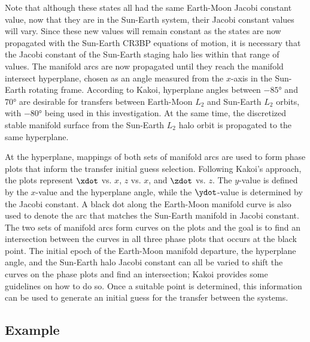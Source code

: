 Note that although these states all had the same Earth-Moon Jacobi constant
value, now that they are in the Sun-Earth system, their Jacobi constant values will vary. Since
these new values will remain constant as the states are now propagated with the Sun-Earth CR3BP
equations of motion, it is necessary that the Jacobi constant of the Sun-Earth staging halo lies
within that range of values. The manifold arcs are now propagated until they reach the manifold
intersect hyperplane, chosen as an angle measured from the $x$-axis in the Sun-Earth rotating
frame. According to Kakoi, hyperplane angles between $-\ang{85}$ and $\ang{70}$ are desirable for
transfers between Earth-Moon $L_{2}$ and Sun-Earth $L_{2}$ orbits, with $\ang{-80}$ being used in
this investigation\cite{Kakoi:2015}. At the same time, the discretized stable manifold surface from
the Sun-Earth $L_{2}$ halo orbit is propagated to the same hyperplane.

At the hyperplane, mappings of both sets of manifold arcs are used to form phase plots that inform
the transfer initial guess selection. Following Kakoi's approach, the plots represent $\xdot$ vs.
$x$, $z$ vs. $x$, and $\zdot$ vs. $z$. The $y$-value is defined by the $x$-value and the hyperplane
angle, while the $\ydot$-value is determined by the Jacobi constant\cite{Kakoi:2015}. A black dot
along the Earth-Moon manifold curve is also used to denote the arc that matches the Sun-Earth
manifold in Jacobi constant. The two sets of manifold arcs form curves on the plots and the goal is
to find an intersection between the curves in all three phase plots that occurs at the black point.
The initial epoch of the Earth-Moon manifold departure, the hyperplane angle, and the Sun-Earth
halo Jacobi constant can all be varied to shift the curves on the phase plots and find an
intersection; Kakoi provides some guidelines on how to do so\cite{Kakoi:2015}. Once a suitable
point is determined, this information can be used to generate an initial guess for the transfer
between the systems.



\subsection{Example}
